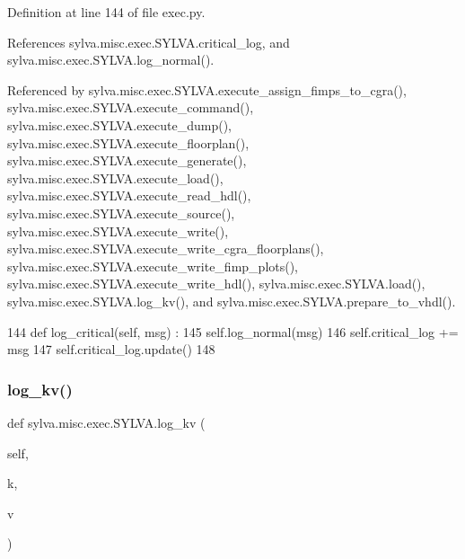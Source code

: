 Definition at line 144 of file exec.\+py.



References sylva.\+misc.\+exec.\+S\+Y\+L\+V\+A.\+critical\+\_\+log, and sylva.\+misc.\+exec.\+S\+Y\+L\+V\+A.\+log\+\_\+normal().



Referenced by sylva.\+misc.\+exec.\+S\+Y\+L\+V\+A.\+execute\+\_\+assign\+\_\+fimps\+\_\+to\+\_\+cgra(), sylva.\+misc.\+exec.\+S\+Y\+L\+V\+A.\+execute\+\_\+command(), sylva.\+misc.\+exec.\+S\+Y\+L\+V\+A.\+execute\+\_\+dump(), sylva.\+misc.\+exec.\+S\+Y\+L\+V\+A.\+execute\+\_\+floorplan(), sylva.\+misc.\+exec.\+S\+Y\+L\+V\+A.\+execute\+\_\+generate(), sylva.\+misc.\+exec.\+S\+Y\+L\+V\+A.\+execute\+\_\+load(), sylva.\+misc.\+exec.\+S\+Y\+L\+V\+A.\+execute\+\_\+read\+\_\+hdl(), sylva.\+misc.\+exec.\+S\+Y\+L\+V\+A.\+execute\+\_\+source(), sylva.\+misc.\+exec.\+S\+Y\+L\+V\+A.\+execute\+\_\+write(), sylva.\+misc.\+exec.\+S\+Y\+L\+V\+A.\+execute\+\_\+write\+\_\+cgra\+\_\+floorplans(), sylva.\+misc.\+exec.\+S\+Y\+L\+V\+A.\+execute\+\_\+write\+\_\+fimp\+\_\+plots(), sylva.\+misc.\+exec.\+S\+Y\+L\+V\+A.\+execute\+\_\+write\+\_\+hdl(), sylva.\+misc.\+exec.\+S\+Y\+L\+V\+A.\+load(), sylva.\+misc.\+exec.\+S\+Y\+L\+V\+A.\+log\+\_\+kv(), and sylva.\+misc.\+exec.\+S\+Y\+L\+V\+A.\+prepare\+\_\+to\+\_\+vhdl().


\begin{DoxyCode}
144   \textcolor{keyword}{def }log\_critical(self, msg) :
145     self.log\_normal(msg)
146     self.critical\_log += msg
147     self.critical\_log.update()
148 
\end{DoxyCode}
\mbox{\label{classsylva_1_1misc_1_1exec_1_1_s_y_l_v_a_a35d5e12cc1b330cff11424aed9a96f95}} 
\subsubsection{\texorpdfstring{log\+\_\+kv()}{log\_kv()}}
{\footnotesize\ttfamily def sylva.\+misc.\+exec.\+S\+Y\+L\+V\+A.\+log\+\_\+kv (\begin{DoxyParamCaption}\item[{}]{self,  }\item[{}]{k,  }\item[{}]{v }\end{DoxyParamCaption})}



